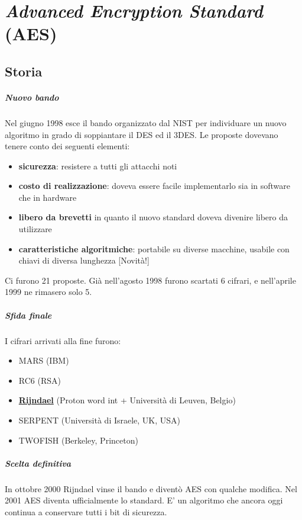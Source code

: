\chapter{\emph{Advanced Encryption Standard} (AES)}
\section{Storia}
\paragraph{Nuovo bando} Nel giugno 1998 esce il bando organizzato dal NIST per individuare un nuovo algoritmo in grado di soppiantare il DES ed il 3DES. Le proposte dovevano tenere conto dei seguenti elementi:
\begin{itemize}
    \item \textbf{sicurezza}: resistere a tutti gli attacchi noti 
    \item \textbf{costo di realizzazione}: doveva essere facile implementarlo sia in software che in hardware 
    \item \textbf{libero da brevetti} in quanto il nuovo standard doveva divenire libero da utilizzare 
    \item \textbf{caratteristiche algoritmiche}: portabile su diverse macchine, usabile con chiavi di diversa lunghezza [Novità!]
\end{itemize}
Ci furono 21 proposte. Già nell'agosto 1998 furono scartati 6 cifrari, e nell'aprile 1999 ne rimasero solo 5.

\paragraph{Sfida finale} I cifrari arrivati alla fine furono:
\begin{itemize}
    \item MARS (IBM)
    \item RC6 (RSA)
    \item \textbf{\underline{Rijndael}} (Proton word int + Università di Leuven, Belgio)
    \item SERPENT (Università di Israele, UK, USA)
    \item TWOFISH (Berkeley, Princeton)
\end{itemize}

\paragraph{Scelta definitiva} In ottobre 2000 Rijndael vinse il bando e diventò AES con qualche modifica.  Nel 2001 AES diventa ufficialmente lo standard. E' un algoritmo che ancora oggi continua a conservare tutti i bit di sicurezza.

